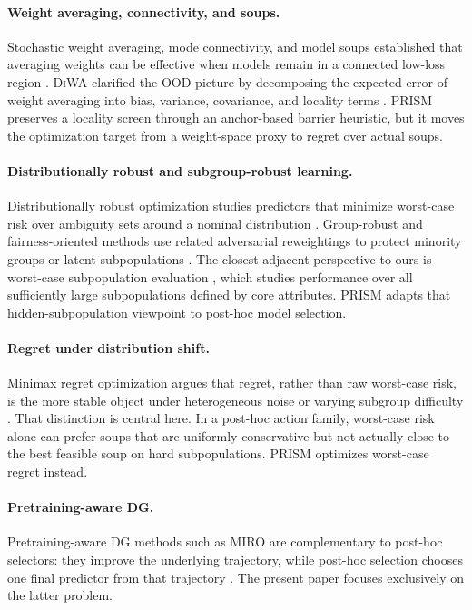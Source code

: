 \documentclass{article}
\newcommand{\prism}{\textup{\textsc{PRISM}}}
\newcommand{\diwa}{\textup{\textsc{DiWA}}}
\newcommand{\miro}{\textup{\textsc{MIRO}}}
\newcommand{\ood}{OOD}
\newcommand{\1}{\mathbbm{1}}
\begin{document}
\paragraph{Weight averaging, connectivity, and soups.}
Stochastic weight averaging, mode connectivity, and model soups established that averaging weights can be effective when models remain in a connected low-loss region \citep{izmailov2018swa,garipov2018fge,frankle2020linear,wortsman2022soups}. \diwa{} clarified the \ood{} picture by decomposing the expected error of weight averaging into bias, variance, covariance, and locality terms \citep{rame2022diwa}. \prism{} preserves a locality screen through an anchor-based barrier heuristic, but it moves the optimization target from a weight-space proxy to regret over actual soups.

\paragraph{Distributionally robust and subgroup-robust learning.}
Distributionally robust optimization studies predictors that minimize worst-case risk over ambiguity sets around a nominal distribution \citep{duchi2016fdiv,duchi2021learning}. Group-robust and fairness-oriented methods use related adversarial reweightings to protect minority groups or latent subpopulations \citep{hashimoto2018fairness,lahoti2020fairness,sagawa2020groupdro}. The closest adjacent perspective to ours is worst-case subpopulation evaluation \citep{li2021worstcase}, which studies performance over all sufficiently large subpopulations defined by core attributes. \prism{} adapts that hidden-subpopulation viewpoint to post-hoc model selection.

\paragraph{Regret under distribution shift.}
Minimax regret optimization argues that regret, rather than raw worst-case risk, is the more stable object under heterogeneous noise or varying subgroup difficulty \citep{agarwal2022mro}. That distinction is central here. In a post-hoc action family, worst-case risk alone can prefer soups that are uniformly conservative but not actually close to the best feasible soup on hard subpopulations. \prism{} optimizes worst-case regret instead.

\paragraph{Pretraining-aware DG.}
Pretraining-aware DG methods such as \miro{} are complementary to post-hoc selectors: they improve the underlying trajectory, while post-hoc selection chooses one final predictor from that trajectory \citep{cha2022miro}. The present paper focuses exclusively on the latter problem.
\end{document}
